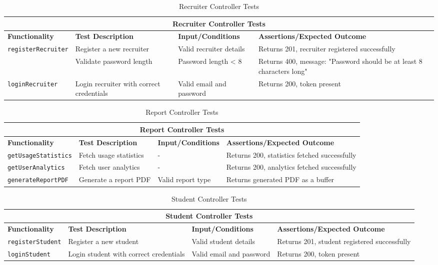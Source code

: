 \begin{table}[ht]
\centering
\begin{tabular}{|p{3.5cm}|p{4cm}|p{3.5cm}|p{5cm}|}
\hline
\multicolumn{4}{|c|}{\textbf{Recruiter Controller Tests}} \\
\hline
\textbf{Functionality} & \textbf{Test Description} & \textbf{Input/Conditions} & \textbf{Assertions/Expected Outcome} \\
\hline
\multirow{2}{*}{\texttt{registerRecruiter}}
 & Register a new recruiter   & Valid recruiter details & Returns 201, recruiter registered successfully \\ \cline{2-4}
 & Validate password length   & Password length < 8     & Returns 400, message: "Password should be at least 8 characters long" \\
\hline
\texttt{loginRecruiter} 
 & Login recruiter with correct credentials 
 & Valid email and password
 & Returns 200, token present \\
\hline
\end{tabular}
\caption{Recruiter Controller Tests}
\label{tab:recruiter_controller_tests}
\end{table}

\begin{table}[ht]
\centering
\begin{tabular}{|p{3.7cm}|p{4cm}|p{3.5cm}|p{5cm}|}
\hline
\multicolumn{4}{|c|}{\textbf{Report Controller Tests}} \\
\hline
\textbf{Functionality} & \textbf{Test Description} & \textbf{Input/Conditions} & \textbf{Assertions/Expected Outcome} \\
\hline
\texttt{getUsageStatistics} &
Fetch usage statistics &
- &
Returns 200, statistics fetched successfully \\
\hline
\texttt{getUserAnalytics} &
Fetch user analytics &
- &
Returns 200, analytics fetched successfully \\
\hline
\texttt{generateReportPDF} &
Generate a report PDF &
Valid report type &
Returns generated PDF as a buffer \\
\hline
\end{tabular}
\caption{Report Controller Tests}
\label{tab:report_controller_tests}
\end{table}

\begin{table}[ht]
\centering
\begin{tabular}{|p{3.2cm}|p{4cm}|p{3.5cm}|p{5cm}|}
\hline
\multicolumn{4}{|c|}{\textbf{Student Controller Tests}} \\
\hline
\textbf{Functionality} & \textbf{Test Description} & \textbf{Input/Conditions} & \textbf{Assertions/Expected Outcome} \\
\hline
\texttt{registerStudent} &
Register a new student &
Valid student details &
Returns 201, student registered successfully \\
\hline
\texttt{loginStudent} &
Login student with correct credentials &
Valid email and password &
Returns 200, token present \\
\hline
\end{tabular}
\caption{Student Controller Tests}
\label{tab:student_controller_tests}
\end{table}

